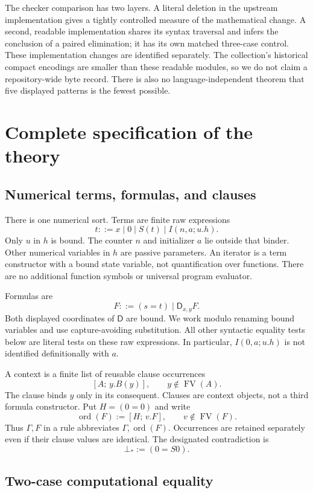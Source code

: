\documentclass[11pt]{article}
\theoremstyle{definition}\newtheorem{definition}[theorem]{Definition}
\newcommand{\D}{\mathsf D}
\newcommand{\FV}{\operatorname{FV}}
\newcommand{\ord}{\operatorname{ord}}
\begin{document}
The checker comparison has two layers. A literal deletion in the
upstream implementation gives a tightly controlled measure of the
mathematical change. A second, readable implementation shares its
syntax traversal and infers the conclusion of a paired elimination;
it has its own matched three-case control. These implementation changes
are identified separately. The collection's historical compact
encodings are smaller than these readable modules, so we do not claim
a repository-wide byte record. There is also no language-independent
theorem that five displayed patterns is the fewest possible.

\section{Complete specification of the theory}\label{sec:spec}

\subsection{Numerical terms, formulas, and clauses}

There is one numerical sort. Terms are finite raw expressions
\[
       t ::= x\mid 0\mid S(t)\mid I(n,a;u.h).
\]
Only $u$ in $h$ is bound. The counter $n$ and initializer $a$ lie
outside that binder. Other numerical variables in $h$ are passive
parameters. An iterator is a term constructor with a bound state
variable, not quantification over functions. There are no additional
function symbols or universal program evaluator.

Formulas are
\[
                  F ::= (s=t)\mid \D_{x,y}F.
\]
Both displayed coordinates of $\D$ are bound. We work modulo
renaming bound variables and use capture-avoiding substitution.
All other syntactic equality tests below are literal tests on these
raw expressions. In particular, $I(0,a;u.h)$ is not identified
definitionally with $a$.

A context is a finite list of reusable clause occurrences
\[
                [A;\,y.B(y)],\qquad y\notin\FV(A).
\]
The clause binds $y$ only in its consequent. Clauses are context
objects, not a third formula constructor. Put $H=(0=0)$ and write
\[
        \ord(F):=[H;\,v.F],\qquad v\notin\FV(F).
\]
Thus $\Gamma,F$ in a rule abbreviates
$\Gamma,\ord(F)$. Occurrences are retained separately even if their
clause values are identical. The designated contradiction is
\[
                           \bot_* := (0=S0).
\]

\subsection{Two-case computational equality}
\end{document}
